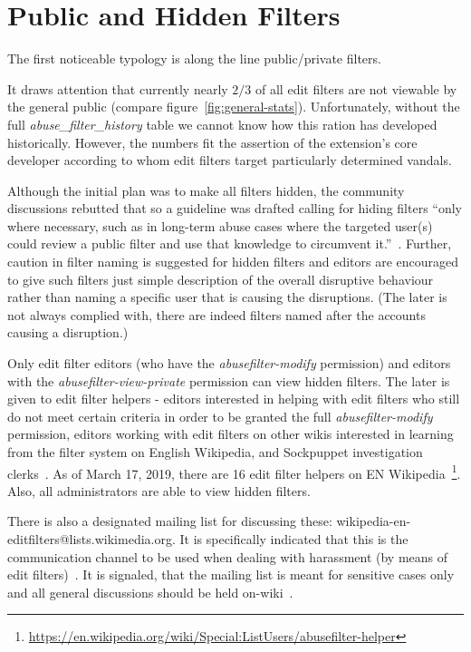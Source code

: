 \section{Public and Hidden Filters}

The first noticeable typology is along the line public/private filters.

It draws attention that currently nearly $2/3$ of all edit filters are not viewable by the general public (compare figure~\ref{fig:general-stats}).
Unfortunately, without the full \emph{abuse\_filter\_history} table we cannot know how this ration has developed historically.
However, the numbers fit the assertion of the extension's core developer according to whom edit filters target particularly determined vandals.

Although the initial plan was to make all filters hidden, the community discussions rebutted that so a guideline was drafted calling for
hiding filters ``only where necessary, such as in long-term abuse cases where the targeted user(s) could review a public filter and use that knowledge to circumvent it.''~\cite{Wikipedia:EditFilter}.
Further, caution in filter naming is suggested for hidden filters and editors are encouraged to give such filters just simple description of the overall disruptive behaviour rather than naming a specific user that is causing the disruptions.
(The later is not always complied with, there are indeed filters named after the accounts causing a disruption.)

Only edit filter editors (who have the \emph{abusefilter-modify} permission) and editors with the \emph{abusefilter-view-private} permission can view hidden filters.
The later is given to edit filter helpers - editors interested in helping with edit filters who still do not meet certain criteria in order to be granted the full \emph{abusefilter-modify} permission, editors working with edit filters on other wikis interested in learning from the filter system on English Wikipedia, and Sockpuppet investigation clerks~\cite{Wikipedia:EditFilterHelper}.
As of March 17, 2019, there are 16 edit filter helpers on EN Wikipedia~\footnote{\url{https://en.wikipedia.org/wiki/Special:ListUsers/abusefilter-helper}}.
Also, all administrators are able to view hidden filters.

There is also a designated mailing list for discussing these: wikipedia-en-editfilters@lists.wikimedia.org.
It is specifically indicated that this is the communication channel to be used when dealing with harassment (by means of edit filters)~\cite{Wikipedia:EditFilter}.
It is signaled, that the mailing list is meant for sensitive cases only and all general discussions should be held on-wiki~\cite{Wikipedia:EditFilter}.

